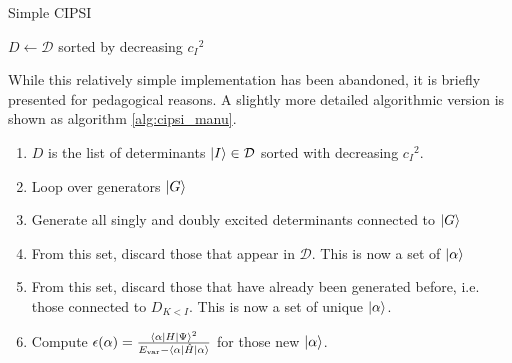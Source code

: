 \documentclass[./thesis.tex]{subfiles}
\begin{document}
\begin{algorithm}
        \caption{Simple CIPSI}
        \label{alg:cipsi_manu}
                \KwData{ $\ket \Psi$ }
                $D \gets \mathcal{D}$ sorted by decreasing ${c_I}^2$ \;
\end{algorithm}

While this relatively simple implementation has been abandoned, it is briefly presented for pedagogical reasons. A slightly more detailed algorithmic version is shown as algorithm \ref{alg:cipsi_manu}.

\begin{enumerate}
\item
$D$ is the list of determinants ${\ket{I}} \in \mathcal{D}$ sorted with decreasing ${c_I}^2$.
\item
Loop over generators $\ket G$
\item
Generate all singly and doubly excited determinants connected to $\ket G$
\item
From this set, discard those that appear in $\mathcal{D}$. This is now a set of $\ket \alpha$
\item
From this set, discard those that have already been generated before, i.e. those connected to $D_{K<I}$. This is now a set of unique $\ket \alpha$.
\item
Compute $\epsilon(\alpha) = \frac{\langle \alpha|H|\Psi\rangle^2}{E_\text{var} - \mel{\alpha}{\hat{H}}{\alpha}}$ for those new $\ket \alpha$.
\end{enumerate}
\end{document}
